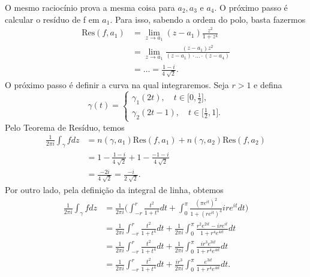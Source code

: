 \documentclass[ComplexAnalysis/complex.tex]{subfiles}
\begin{document}
\begin{exer*}
	O mesmo raciocínio prova a mesma coisa para \(a_{2}, a_3\) e \(a_{4}\). O próximo passo é calcular o resíduo de f em \(a_{1}.\) Para isso, sabendo a ordem
	do polo, basta fazermos
	\begin{align*}
		\mathrm{Res}(f , a_{1}) & = \lim_{z\to a_{1}}(z-a_{1})\frac{z^{2}}{1+z^{4}}                               \\
		                        & = \lim_{z\to a_{1}}\frac{(z-a_{1})z^{2}}{(z-a_{1})\cdot \dotsc \cdot (z-a_{4})} \\
		                        & = \dotsc = \frac{1-i}{4\sqrt[]{2}}.
	\end{align*}
	O próximo passo é definir a curva na qual integraremos. Seja \(r > 1\) e defina
	\[
		\gamma (t) = \left\{\begin{array}{ll}
			\gamma_{1}(2t),\quad t\in \biggl[0, \frac{1}{2}\biggr], \\
			\gamma_{2}(2t-1),\quad t\in \biggl[\frac{1}{2}, 1\biggr].
		\end{array}\right.
	\]
	Pelo Teorema de Resíduo, temos
	\begin{align*}
		\frac{1}{2\pi i}\int_{\gamma }^{}f dz & = n(\gamma , a_{1})\mathrm{Res}(f, a_{1}) + n(\gamma , a_{2})\mathrm{Res}(f, a_{2}) \\
		                                      & = 1 - \frac{1-i}{4\sqrt[]{2}} + 1 - \frac{-1-i}{4\sqrt[]{2}}                        \\
		                                      & = \frac{-2i}{4\sqrt[]{2}} = \frac{-i}{2\sqrt[]{2}}.
	\end{align*}
	Por outro lado, pela definição da integral de linha, obtemos
	\begin{align*}
		\frac{1}{2\pi i}\int_{\gamma }^{}f dz & = \frac{1}{2\pi i}\biggl(\int_{-r}^{r}\frac{t^{2}}{1+t^{4}}dt + \int_{0}^{\pi }\frac{(\pi e^{it})^{2}}{1 + (re^{it})^{4}}ire^{it}dt\biggr)   \\
		                                      & = \frac{1}{2\pi i}\int_{-r}^{r}\frac{t^{2}}{1+t^{4}}dt + \frac{1}{2\pi i}\int_{0}^{\pi }\frac{r^{2}e^{2it} - i r e^{it}}{1 + r^{4}e^{4it}}dt \\
		                                      & = \frac{1}{2\pi i}\int_{-r}^{r}\frac{t^{2}}{1+t^{4}}dt + \frac{1}{2\pi i}\int_{0}^{\pi }\frac{ir^{3}e^{3it}}{1 + r^{4}e^{4it}}dt             \\
		                                      & = \frac{1}{2\pi i}\int_{-r}^{r}\frac{t^{2}}{1+t^{4}}dt + \frac{ir^{3}}{2\pi i}\int_{0}^{\pi }\frac{e^{3it}}{1 + r^{4}e^{4it}}dt.
	\end{align*}

\end{exer*}
\end{document}
